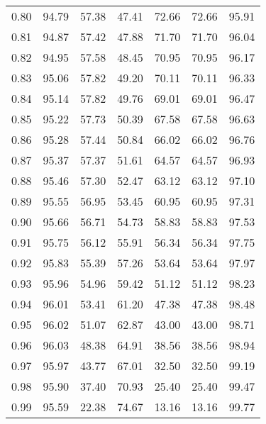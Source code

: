 \begin{tabular}{|c|c|c|c|c|c|c|}
      0.80 &     94.79 &     57.38 &      47.41 &   72.66 &      72.66 &         95.91 \\
      0.81 &     94.87 &     57.42 &      47.88 &   71.70 &      71.70 &         96.04 \\
      0.82 &     94.95 &     57.58 &      48.45 &   70.95 &      70.95 &         96.17 \\
      0.83 &     95.06 &     57.82 &      49.20 &   70.11 &      70.11 &         96.33 \\
      0.84 &     95.14 &     57.82 &      49.76 &   69.01 &      69.01 &         96.47 \\
      0.85 &     95.22 &     57.73 &      50.39 &   67.58 &      67.58 &         96.63 \\
      0.86 &     95.28 &     57.44 &      50.84 &   66.02 &      66.02 &         96.76 \\
      0.87 &     95.37 &     57.37 &      51.61 &   64.57 &      64.57 &         96.93 \\
      0.88 &     95.46 &     57.30 &      52.47 &   63.12 &      63.12 &         97.10 \\
      0.89 &     95.55 &     56.95 &      53.45 &   60.95 &      60.95 &         97.31 \\
      0.90 &     95.66 &     56.71 &      54.73 &   58.83 &      58.83 &         97.53 \\
      0.91 &     95.75 &     56.12 &      55.91 &   56.34 &      56.34 &         97.75 \\
      0.92 &     95.83 &     55.39 &      57.26 &   53.64 &      53.64 &         97.97 \\
      0.93 &     95.96 &     54.96 &      59.42 &   51.12 &      51.12 &         98.23 \\
      0.94 &     96.01 &     53.41 &      61.20 &   47.38 &      47.38 &         98.48 \\
      0.95 &     96.02 &     51.07 &      62.87 &   43.00 &      43.00 &         98.71 \\
      0.96 &     96.03 &     48.38 &      64.91 &   38.56 &      38.56 &         98.94 \\
      0.97 &     95.97 &     43.77 &      67.01 &   32.50 &      32.50 &         99.19 \\
      0.98 &     95.90 &     37.40 &      70.93 &   25.40 &      25.40 &         99.47 \\
      0.99 &     95.59 &     22.38 &      74.67 &   13.16 &      13.16 &         99.77 \\
\bottomrule
\end{tabular}
